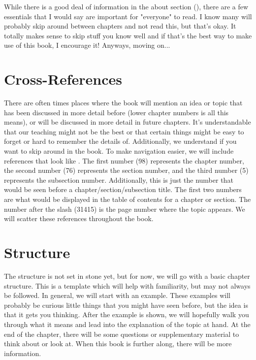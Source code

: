 \documentclass[../OpenAppliedMusicTheory.tex]{subfiles}
\begin{document}
    
    
    While there is a good deal of information in the about section (), there are a few essentials that I would say are important for "everyone" to read. I know many will probably skip around between chapters and not read this, but that's okay. It totally makes sense to skip stuff you know well and if that's the best way to make use of this book, I encourage it! Anyways, moving on...
    
    \section{Cross-References}\label{ch.0:references}
    There are often times places where the book will mention an idea or topic that has been discussed in more detail before (lower chapter numbers is all this means), or will be discussed in more detail in future chapters. It's understandable that our teaching might not be the best or that certain things might be easy to forget or hard to remember the details of. Additionally, we understand if you want to skip around in the book. To make navigation easier, we will include references that look like . The first number (98) represents the chapter number, the second number (76) represents the section number, and the third number (5) represents the subsection number. Additionally, this is just the number that would be seen before a chapter/section/subsection %
    title. The first two numbers are what would be displayed in the table of contents for a chapter or section. The number after the slash (31415) is the page number where the topic appears. We will scatter these references throughout the book.

    \section{Structure}\label{ch.0:structure}
    The structure is not set in stone yet, but for now, we will go with a basic chapter structure. This is a template which will help with familiarity, but may not always be followed. In general, we will start with an example. These examples will probably be curious little things that you might have seen before, but the idea is that it gets you thinking. After the example is shown, we will hopefully walk you through what it means and lead into the explanation of the topic at hand. At the end of the chapter, there will be some questions or supplementary material to think about or look at. When this book is further along, there will be more information. %
\end{document}
